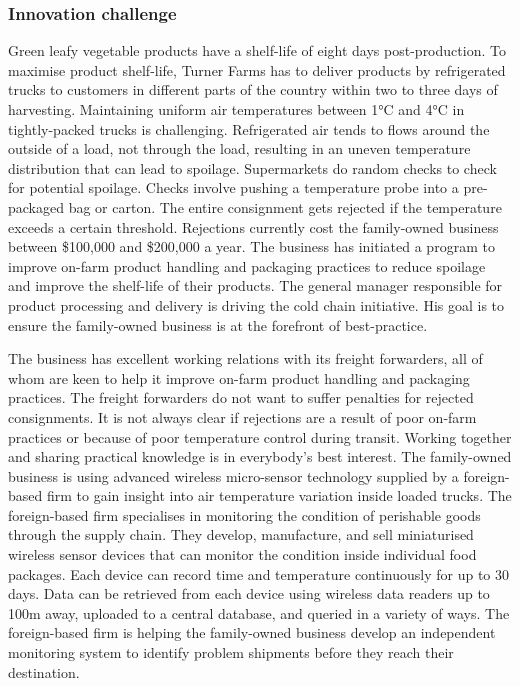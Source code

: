 \subsubsection{Innovation challenge}

Green leafy vegetable products have a shelf-life of eight days post-production. To maximise product shelf-life, Turner Farms has to deliver products by refrigerated trucks to customers in different parts of the country within two to three days of harvesting. Maintaining uniform air temperatures between 1\si{\degree}C and 4\si{\degree}C in tightly-packed trucks is challenging. Refrigerated air tends to flows around the outside of a load, not through the load, resulting in an uneven temperature distribution that can lead to spoilage. Supermarkets do random checks to check for potential spoilage. Checks involve pushing a temperature probe into a pre-packaged bag or carton. The entire consignment gets rejected if the temperature exceeds a certain threshold. Rejections currently cost the family-owned business between \$100,000 and \$200,000 a year. The business has initiated a program to improve on-farm product handling and packaging practices to reduce spoilage and improve the shelf-life of their products. The general manager responsible for product processing and delivery is driving the cold chain initiative. His goal is to ensure the family-owned business is at the forefront of best-practice. \medskip

The business has excellent working relations with its freight forwarders, all of whom are keen to help it improve on-farm product handling and packaging practices. The freight forwarders do not want to suffer penalties for rejected consignments. It is not always clear if rejections are a result of poor on-farm practices or because of poor temperature control during transit. Working together and sharing practical knowledge is in everybody's best interest. The family-owned business is using advanced wireless micro-sensor technology supplied by a foreign-based firm to gain insight into air temperature variation inside loaded trucks. The foreign-based firm specialises in monitoring the condition of perishable goods through the supply chain. They develop, manufacture, and sell miniaturised wireless sensor devices that can monitor the condition inside individual food packages. Each device can record time and temperature continuously for up to 30 days. Data can be retrieved from each device using wireless data readers up to 100m away, uploaded to a central database, and queried in a variety of ways. The foreign-based firm is helping the family-owned business develop an independent monitoring system to identify problem shipments before they reach their destination. \medskip

